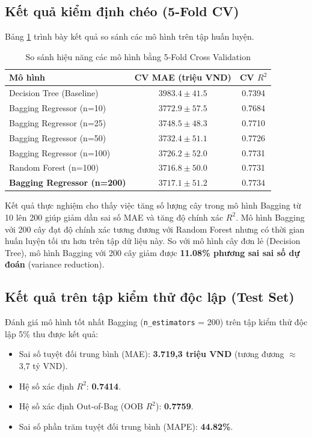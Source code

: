 \documentclass[sigconf]{acmart}
\begin{document}
\subsection{Kết quả kiểm định chéo (5-Fold CV)}
Bảng \ref{tab:model_comparison} trình bày kết quả so sánh các mô hình trên tập huấn luyện.

\begin{table}[h]
\caption{So sánh hiệu năng các mô hình bằng 5-Fold Cross Validation}
\label{tab:model_comparison}
\begin{tabular}{lcc}
\toprule
Mô hình & CV MAE (triệu VND) & CV $R^2$ \\
\midrule
Decision Tree (Baseline) & $3983.4 \pm 41.5$ & 0.7394 \\
Bagging Regressor (n=10) & $3772.9 \pm 57.5$ & 0.7684 \\
Bagging Regressor (n=25) & $3748.5 \pm 48.3$ & 0.7710 \\
Bagging Regressor (n=50) & $3732.4 \pm 51.1$ & 0.7726 \\
Bagging Regressor (n=100) & $3726.2 \pm 52.0$ & 0.7731 \\
Random Forest (n=100) & $3716.8 \pm 50.0$ & 0.7731 \\
\textbf{Bagging Regressor (n=200)} & $\mathbf{3717.1 \pm 51.2}$ & $\mathbf{0.7734}$ \\
\bottomrule
\end{tabular}
\end{table}

Kết quả thực nghiệm cho thấy việc tăng số lượng cây trong mô hình Bagging từ 10 lên 200 giúp giảm dần sai số MAE và tăng độ chính xác $R^2$. Mô hình Bagging với 200 cây đạt độ chính xác tương đương với Random Forest nhưng có thời gian huấn luyện tối ưu hơn trên tập dữ liệu này. So với mô hình cây đơn lẻ (Decision Tree), mô hình Bagging với 200 cây giảm được \textbf{11.08\% phương sai sai số dự đoán} (variance reduction).

\subsection{Kết quả trên tập kiểm thử độc lập (Test Set)}
Đánh giá mô hình tốt nhất Bagging (\texttt{n\_estimators} = 200) trên tập kiểm thử độc lập 5\% thu được kết quả:
\begin{itemize}
    \item Sai số tuyệt đối trung bình (MAE): \textbf{3.719,3 triệu VND} (tương đương $\approx$ 3,7 tỷ VND).
    \item Hệ số xác định $R^2$: \textbf{0.7414}.
    \item Hệ số xác định Out-of-Bag (OOB $R^2$): \textbf{0.7759}.
    \item Sai số phần trăm tuyệt đối trung bình (MAPE): \textbf{44.82\%}.
\end{itemize}
\end{document}
